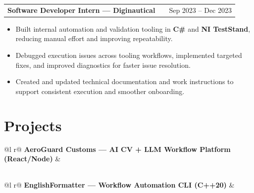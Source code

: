 \documentclass[a4paper,11pt]{article}
\makeatletter
\newenvironment{joblong}[2]
  {\begin{tabularx}{\linewidth}{@{}l X r@{}}\textbf{#1} & \hfill & #2 \\[-2pt]\end{tabularx}
   \begin{minipage}[t]{\linewidth}\begin{itemize}[nosep,leftmargin=1em,itemsep=1pt,label=--]}
  {\end{itemize}\end{minipage}}
\makeatother
\begin{document}
\vspace{3pt}

\begin{joblong}{Software Developer Intern — Diginautical}{Sep 2023 -- Dec 2023}
\item Built internal automation and validation tooling in \textbf{C\#} and \textbf{NI TestStand}, reducing manual effort and improving repeatability.
\item Debugged execution issues across tooling workflows, implemented targeted fixes, and improved diagnostics for faster issue resolution.
\item Created and updated technical documentation and work instructions to support consistent execution and smoother onboarding.
\end{joblong}

\vspace{-2pt}

\section*{Projects}

\begin{tabularx}{\linewidth}{@{}l r@{}}
\textbf{AeroGuard Customs — AI CV + LLM Workflow Platform (React/Node)} & \hfill \href{https://github.com/InderParmar/aeroguard-customs}{\faGithub} \\[2pt]
\\
\end{tabularx}

\vspace{-2pt}

\begin{tabularx}{\linewidth}{@{}l r@{}}
\textbf{EnglishFormatter — Workflow Automation CLI (C++20)} & \hfill \href{https://github.com/Fahad-Ali-Khan-ca/EnglishFormatter}{\faGithub} \\[2pt]
\\
\end{tabularx}
\end{document}
